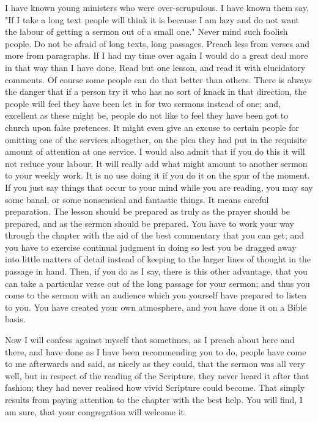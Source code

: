\documentclass[12pt,a5paper,twoside,titlepage]{book}
\begin{document}
I have known young ministers who were 
over-scrupulous. I have known them say, "If I 
take a long text people will think it is because 
I am lazy and do not want the labour of getting 
a sermon out of a small one." Never mind such 
foolish people. Do not be afraid of long texts, 
long passages. Preach less from verses and 
more from paragraphs. If I had my time over 
again I would do a great deal more in that way 
than I have done. Read but one lesson, and read 
it with elucidatory comments. Of course some 
people can do that better than others. There 
is always the danger that if a person try it who 
has no sort of knack in that direction, the people 
will feel they have been let in for two sermons 
instead of one; and, excellent as these might 
be, people do not like to feel they have been got 
to church upon false pretences. It might even 
give an excuse to certain people for omitting 
one of the services altogether, on the plea they 
had put in the requisite amount of attention at 
one service. I would also admit that if you do 
this it will not reduce your labour. It will really 
add what might amount to another sermon to 
your weekly work. It is no use doing it if you 
do it on the spur of the moment. If you just say 
things that occur to your mind while you are 
reading, you may say some banal, or some nonsensical 
and fantastic things. It means careful 
preparation. The lesson should be prepared as 
truly as the prayer should be prepared, and as 
the sermon should be prepared. You have to 
work your way through the chapter with the 
aid of the best commentary that you can get; 
and you have to exercise continual judgment in 
doing so lest you be dragged away into little 
matters of detail instead of keeping to the 
larger lines of thought in the passage in hand. 
Then, if you do as I say, there is this other 
advantage, that you can take a particular verse 
out of the long passage for your sermon; and 
thus you come to the sermon with an audience 
which you yourself have prepared to listen to 
you. You have created your own atmosphere, 
and you have done it on a Bible basis. 

Now I will confess against myself that sometimes, 
as I preach about here and there, and 
have done as I have been recommending you to 
do, people have come to me afterwards and said, 
as nicely as they could, that the sermon was all 
very well, but in respect of the reading of the 
Scripture, they never heard it after that fashion; 
they had never realised how vivid Scripture 
could become. That simply results from paying 
attention to the chapter with the best help. 
You will find, I am sure, that your congregation 
will welcome it.
\end{document}
